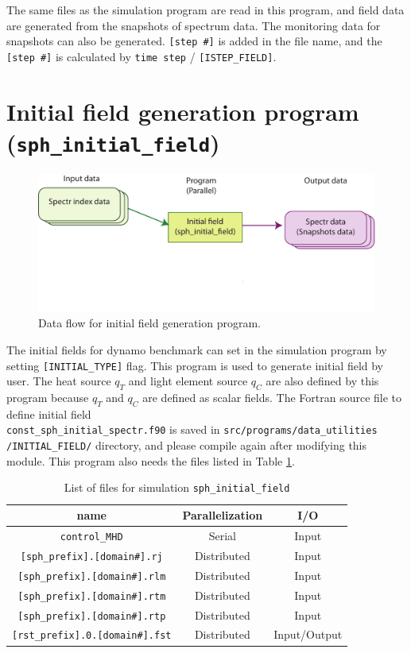 The same files as the simulation program are read in this program, and field data are generated from the snapshots of spectrum data. The monitoring data for snapshots can also be generated. \verb|[step #]| is added in the file name, and the \verb|[step #]| is calculated by \verb|time step| / \verb|[ISTEP_FIELD]|.

\newpage
\section{Initial field generation program \\
({\tt sph\_initial\_field})}
\label{sec:sph_initial_field}
%
\begin{figure}[htbp]
\begin{center}
\includegraphics*[width=130mm]{images/flow_ini}
\end{center}
\caption{Data flow for initial field generation program.}
\label{fig:flow_ini}
\end{figure}
%
 The initial fields for dynamo benchmark can set in the simulation program by setting \verb|[INITIAL_TYPE]| flag. This program is used to generate initial field by user.  The heat source $q_{T}$ and light element source $q_{C}$ are also defined by this program because $q_{T}$ and $q_{C}$ are defined as scalar fields.  The Fortran source file to define initial field \\
 \verb|const_sph_initial_spectr.f90| is saved in \verb|src/programs/data_utilities| \\
 \verb|/INITIAL_FIELD/| directory,  and please compile again after modifying this module. This program also needs the files listed in Table \ref{table:inital_fld}.
%
\begin{table}[htdp]
\caption{List of files for simulation {\tt sph\_initial\_field} }
\begin{center} 
\begin{tabular}{|c|c|c|}
\hline
 name & Parallelization & I/O \\ \hline \hline
\verb|control_MHD| & Serial & Input \\ \hline
\verb|[sph_prefix].[domain#].rj|  & Distributed & Input \\
\verb|[sph_prefix].[domain#].rlm| & Distributed & Input \\
\verb|[sph_prefix].[domain#].rtm| & Distributed & Input \\
\verb|[sph_prefix].[domain#].rtp| & Distributed & Input \\ \hline
\verb|[rst_prefix].0.[domain#].fst| &  Distributed & Input/Output  \\ \hline
\end{tabular}
\end{center}
\label{table:inital_fld}
\end{table}
